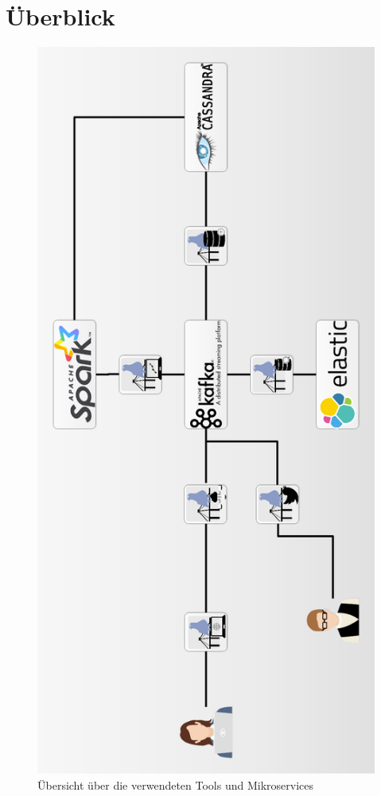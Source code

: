 \chapter{Überblick}

\begin{figure}
\centering
\includegraphics[scale=.25]{material/architecture/Architektur.png}
\caption{Übersicht über die verwendeten Tools und Mikroservices}
\end{figure}

